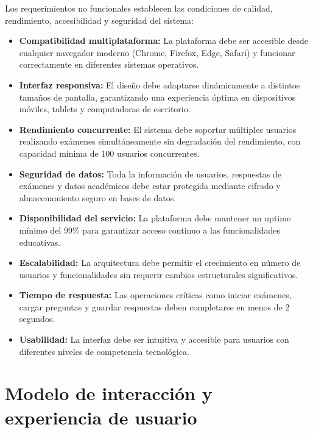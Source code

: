 \documentclass[12pt,a4paper]{report}
\begin{document}
Los requerimientos no funcionales establecen las condiciones de calidad, rendimiento, accesibilidad y seguridad del sistema:

\begin{itemize}
\item \textbf{Compatibilidad multiplataforma:} La plataforma debe ser accesible desde cualquier navegador moderno (Chrome, Firefox, Edge, Safari) y funcionar correctamente en diferentes sistemas operativos.

\item \textbf{Interfaz responsiva:} El diseño debe adaptarse dinámicamente a distintos tamaños de pantalla, garantizando una experiencia óptima en dispositivos móviles, tablets y computadoras de escritorio.

\item \textbf{Rendimiento concurrente:} El sistema debe soportar múltiples usuarios realizando exámenes simultáneamente sin degradación del rendimiento, con capacidad mínima de 100 usuarios concurrentes.

\item \textbf{Seguridad de datos:} Toda la información de usuarios, respuestas de exámenes y datos académicos debe estar protegida mediante cifrado y almacenamiento seguro en bases de datos.

\item \textbf{Disponibilidad del servicio:} La plataforma debe mantener un uptime mínimo del 99\% para garantizar acceso continuo a las funcionalidades educativas.

\item \textbf{Escalabilidad:} La arquitectura debe permitir el crecimiento en número de usuarios y funcionalidades sin requerir cambios estructurales significativos.

\item \textbf{Tiempo de respuesta:} Las operaciones críticas como iniciar exámenes, cargar preguntas y guardar respuestas deben completarse en menos de 2 segundos.

\item \textbf{Usabilidad:} La interfaz debe ser intuitiva y accesible para usuarios con diferentes niveles de competencia tecnológica.
\end{itemize}

\section{Modelo de interacción y experiencia de usuario}
\end{document}
